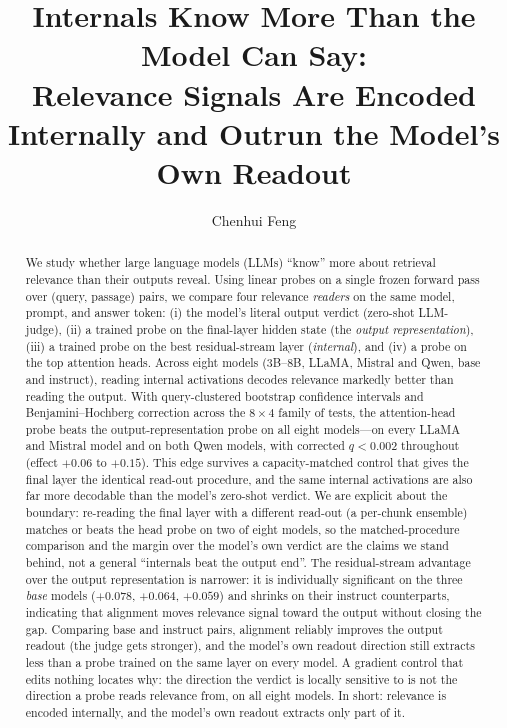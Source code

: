 \documentclass[11pt]{article}
\title{\textbf{Internals Know More Than the Model Can Say:\\
Relevance Signals Are Encoded Internally and Outrun the Model's Own Readout}}
\author{Chenhui Feng}
\affil{Nanjing University of Aeronautics and Astronautics}
\date{}
\begin{document}
\maketitle

\begin{abstract}
We study whether large language models (LLMs) ``know'' more about retrieval
relevance than their outputs reveal. Using linear probes on a single
frozen forward pass over (query, passage) pairs, we compare four
relevance \emph{readers} on the same model, prompt, and answer token:
(i) the model's literal output verdict (zero-shot LLM-judge), (ii) a trained
probe on the final-layer hidden state (the \emph{output representation}),
(iii) a trained probe on the best residual-stream layer (\emph{internal}),
and (iv) a probe on the top attention heads. Across eight models (3B--8B,
LLaMA, Mistral and Qwen, base and instruct), reading internal activations decodes
relevance markedly better than reading the output. With query-clustered
bootstrap confidence intervals and Benjamini--Hochberg correction across the
$8\times4$ family of tests, the attention-head probe beats the
output-representation probe on all eight models---on every LLaMA and Mistral
model and on both Qwen models, with corrected $q<0.002$ throughout
(effect $+0.06$ to $+0.15$). This edge survives a capacity-matched control
that gives the final layer the identical read-out procedure, and the same
internal activations are also far more decodable than the model's zero-shot
verdict. We are explicit about the boundary: re-reading the final layer with a
different read-out (a per-chunk ensemble) matches or beats the head probe on
two of eight models, so the matched-procedure comparison and the margin over
the model's own verdict are the claims we stand behind, not a general
``internals beat the output end''. The residual-stream advantage over the
output representation is narrower: it is individually significant on the three
\emph{base} models
($+0.078$, $+0.064$, $+0.059$) and shrinks on their instruct counterparts,
indicating that alignment moves relevance signal toward the output without
closing the gap. Comparing base and instruct pairs, alignment reliably
improves the output readout (the judge gets stronger), and the model's own
readout direction still extracts less than a probe trained on the same layer on
every model. A gradient control that edits nothing locates why: the direction
the verdict is locally sensitive to is not the direction a probe reads relevance
from, on all eight models. In short: relevance is encoded internally, and the
model's own readout extracts only part of it.
\end{abstract}
\end{document}
